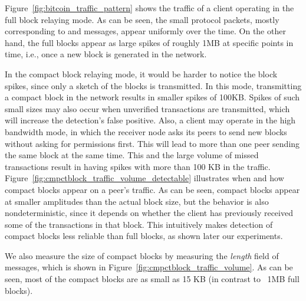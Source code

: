 Figure~\ref{fig:bitcoin_traffic_pattern} shows the traffic of a \bc client operating in the full block relaying mode.
As can be seen, the small protocol packets, mostly corresponding to  and  messages, appear 
uniformly over the time. 
On the other hand, the \bc full blocks appear as large spikes of roughly 1MB at specific points in time, i.e., once a new block is generated in the network. 

In the compact block relaying mode, it would be harder to notice the block spikes, 
since only a sketch of the blocks is transmitted. In this mode, transmitting a compact block in the network results in smaller spikes of 100KB. Spikes of such small sizes may also occur when unverified transactions are transmitted, which will increase the detection's false positive. Also, a \bc client may operate in the high bandwidth mode, in which the receiver node  asks its peers to send new blocks without asking for permissions first. This will lead to more than one peer sending the same block at the same time. This and the large volume of missed transactions result in having spikes with more than 100 KB in the traffic. 
Figure~\ref{fig:cmpctblock_traffic_volume_detectable} illustrates  when and how
compact blocks appear on a peer's traffic. As can be seen, compact blocks appear at
smaller amplitudes than the actual block size, but the behavior is also nondeterministic,
since it depends on whether the client has previously received some of the transactions
in that block. This intuitively makes detection of compact blocks less reliable than full blocks, as shown later our experiments. 

We also measure the size of compact blocks by measuring the 
\textit{length} field of  messages, which is shown in Figure~\ref{fig:cmpctblock_traffic_volume}. 
As can be seen, most of the compact blocks are as small as 15 KB (in contrast to ~1MB full blocks). 

